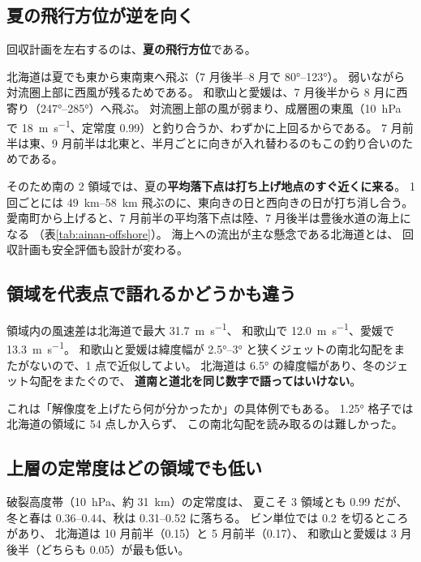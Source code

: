 \subsection{夏の飛行方位が逆を向く}

回収計画を左右するのは、\textbf{夏の飛行方位}である。

北海道は夏でも東から東南東へ飛ぶ（7 月後半--8 月で \ang{80}--\ang{123}）。
弱いながら対流圏上部に西風が残るためである。
和歌山と愛媛は、7 月後半から 8 月に西寄り（\ang{247}--\ang{285}）へ飛ぶ。
対流圏上部の風が弱まり、成層圏の東風（\SI{10}{\hecto\pascal} で
\SI{18}{\metre\per\second}、定常度 0.99）と釣り合うか、わずかに上回るからである。
7 月前半は東、9 月前半は北東と、半月ごとに向きが入れ替わるのもこの釣り合いのためである。

そのため南の 2 領域では、夏の\textbf{平均落下点は打ち上げ地点のすぐ近くに来る}。
1 回ごとには \SIrange{49}{58}{\kilo\metre} 飛ぶのに、東向きの日と西向きの日が打ち消し合う。
愛南町から上げると、7 月前半の平均落下点は陸、7 月後半は豊後水道の海上になる
（表\ref{tab:ainan-offshore}）。
海上への流出が主な懸念である北海道とは、
回収計画も安全評価も設計が変わる。

\subsection{領域を代表点で語れるかどうかも違う}

領域内の風速差は北海道で最大 \SI{31.7}{\metre\per\second}、
和歌山で \SI{12.0}{\metre\per\second}、愛媛で \SI{13.3}{\metre\per\second}。
和歌山と愛媛は緯度幅が \ang{2.5}--\ang{3} と狭くジェットの南北勾配をまたがないので、1 点で近似してよい。
北海道は \ang{6.5} の緯度幅があり、冬のジェット勾配をまたぐので、
\textbf{道南と道北を同じ数字で語ってはいけない}。

これは「解像度を上げたら何が分かったか」の具体例でもある。
\ang{1.25} 格子では北海道の領域に 54 点しか入らず、
この南北勾配を読み取るのは難しかった。

\subsection{上層の定常度はどの領域でも低い}

破裂高度帯（\SI{10}{\hecto\pascal}、約 \SI{31}{\kilo\metre}）の定常度は、
夏こそ 3 領域とも 0.99 だが、冬と春は 0.36--0.44、秋は 0.31--0.52 に落ちる。
ビン単位では 0.2 を切るところがあり、
北海道は 10 月前半（0.15）と 5 月前半（0.17）、
和歌山と愛媛は 3 月後半（どちらも 0.05）が最も低い。

